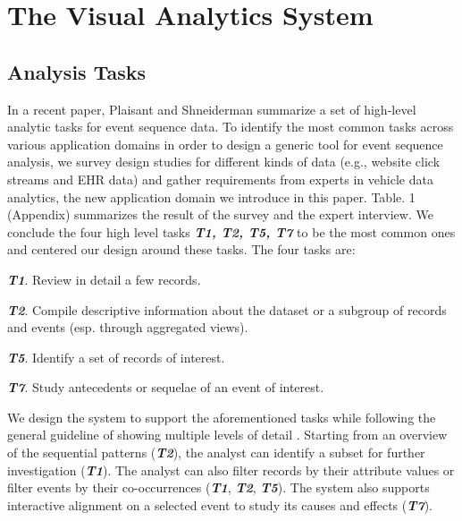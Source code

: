 \section{The Visual Analytics System}
\label{section:design}


\subsection{Analysis Tasks}

In a recent paper, Plaisant and Shneiderman \cite{plaisant2016tasks} summarize a set of high-level analytic tasks for event sequence data. To identify the most common tasks across various application domains in order to design a generic tool for event sequence analysis,  we survey design studies for different kinds of data (e.g., website click streams and EHR data) and gather requirements from experts in vehicle data analytics, the new application domain we introduce in this paper. Table. 1 (Appendix) summarizes the result of the survey and the expert interview. We conclude the four high level tasks \textit{\textbf{T1, T2, T5, T7}} to be the most common ones and centered our design around these tasks. The four tasks are:
\begin{compactitem}[]
	\item \textbf{\textit{T1}}. Review in detail a few records.
	\item \textbf{\textit{T2}}. Compile descriptive information about the dataset or a subgroup of records and events (esp. through aggregated views).
	\item \textbf{\textit{T5}}. Identify a set of records of interest.
	\item \textbf{\textit{T7}}. Study antecedents or sequelae of an event of interest.
\end{compactitem}

We design the system to support the aforementioned tasks while following the general guideline of showing multiple levels of detail \cite{shneiderman1996eyes}. Starting from an overview of the sequential patterns (\textbf{\textit{T2}}), the analyst can identify a subset for further investigation (\textbf{\textit{T1}}). The analyst can also filter records by their attribute values or filter events by their co-occurrences (\textbf{\textit{T1}}, \textbf{\textit{T2}}, \textbf{\textit{T5}}). The system also supports interactive alignment on a selected event to study its causes and effects (\textbf{\textit{T7}}).

